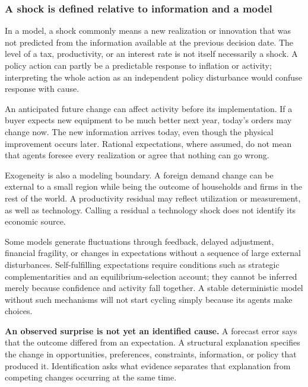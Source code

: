 \subsubsection{A shock is defined relative to information and a model}

In a model, a shock commonly means a new realization or innovation that
was not predicted from the information available at the previous decision
date. The level of a tax, productivity, or an interest rate is not itself
necessarily a shock. A policy action can partly be a predictable response
to inflation or activity; interpreting the whole action as an independent
policy disturbance would confuse response with cause.

An anticipated future change can affect activity before its implementation.
If a buyer expects new equipment to be much better next year, today's orders
may change now. The new information arrives today, even though the physical
improvement occurs later. Rational expectations, where assumed, do not mean
that agents foresee every realization or agree that nothing can go wrong.

Exogeneity is also a modeling boundary. A foreign demand change can be
external to a small region while being the outcome of households and firms
in the rest of the world. A productivity residual may reflect utilization
or measurement, as well as technology. Calling a residual a technology shock
does not identify its economic source.

Some models generate fluctuations through feedback, delayed adjustment,
financial fragility, or changes in expectations without a sequence of large
external disturbances. Self-fulfilling expectations require conditions such
as strategic complementarities and an equilibrium-selection account; they
cannot be inferred merely because confidence and activity fall together.
A stable deterministic model without such mechanisms will not start cycling
simply because its agents make choices.

\begin{blueblock}
\textbf{An observed surprise is not yet an identified cause.}
A forecast error says that the outcome differed from an expectation.
A structural explanation specifies the change in opportunities, preferences,
constraints, information, or policy that produced it. Identification asks
what evidence separates that explanation from competing changes occurring
at the same time.
\end{blueblock}

